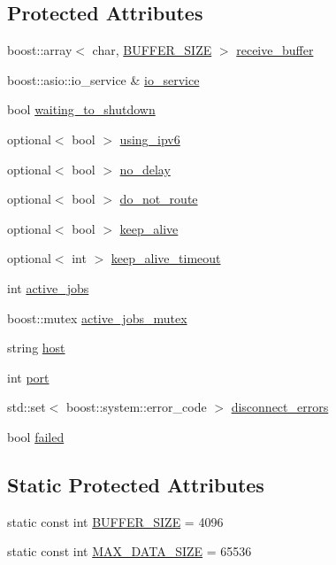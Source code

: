 \subsection*{Protected Attributes}
\begin{DoxyCompactItemize}
\item 
boost::array$<$ char, \hyperlink{classTcp_a9302fa700d80ca1aed86e41e02925051}{BUFFER\_\-SIZE} $>$ \hyperlink{classTcp_aeb630e95d24f26852437098df5896b16}{receive\_\-buffer}
\item 
boost::asio::io\_\-service \& \hyperlink{classTcp_ad0c319a0974aa3f07e9c5ae290ea18b4}{io\_\-service}
\item 
bool \hyperlink{classTcp_a96b0558a6ce522708bfd06cf1e6e45ba}{waiting\_\-to\_\-shutdown}
\item 
optional$<$ bool $>$ \hyperlink{classTcp_a395b2458742a84d78c1107ac8b59a7a8}{using\_\-ipv6}
\item 
optional$<$ bool $>$ \hyperlink{classTcp_a00a788b6d5b91b31b340f942617b9dda}{no\_\-delay}
\item 
optional$<$ bool $>$ \hyperlink{classTcp_a6bff7fed84126b745930da36030c68c7}{do\_\-not\_\-route}
\item 
optional$<$ bool $>$ \hyperlink{classTcp_a5cec5af76ec94551f8dc5f98639e9953}{keep\_\-alive}
\item 
optional$<$ int $>$ \hyperlink{classTcp_a08e171f501f01c117f5a3c04d394d137}{keep\_\-alive\_\-timeout}
\item 
int \hyperlink{classTcp_a4811b96fe77f74f10b14aac532036708}{active\_\-jobs}
\item 
boost::mutex \hyperlink{classTcp_adcd27ee2753e2c0c43f58efa882a3ab5}{active\_\-jobs\_\-mutex}
\item 
string \hyperlink{classTcp_a0e981d15f94a460b91845bce9b930c61}{host}
\item 
int \hyperlink{classTcp_a7ed15f78afc9d0675404b4b41cc723ba}{port}
\item 
std::set$<$ boost::system::error\_\-code $>$ \hyperlink{classTcp_adcbc3e86d98f8ba37247674cf67f77fd}{disconnect\_\-errors}
\item 
bool \hyperlink{classTcp_a9dbc59f5343aa045be1a888356ef6fbf}{failed}
\end{DoxyCompactItemize}
\subsection*{Static Protected Attributes}
\begin{DoxyCompactItemize}
\item 
static const int \hyperlink{classTcp_a9302fa700d80ca1aed86e41e02925051}{BUFFER\_\-SIZE} = 4096
\item 
static const int \hyperlink{classTcp_a169a3d26315c2b5eecc02354ef44b777}{MAX\_\-DATA\_\-SIZE} = 65536
\end{DoxyCompactItemize}
